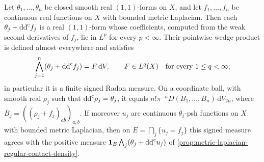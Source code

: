 \begin{corollary}\label{cor:metric-laplacian-barrier-determinants}
Let $\theta_1,\ldots,\theta_n$ be closed smooth real $(1,1)$-forms on $X$, and let $f_1,\ldots,f_n$ be continuous real functions on $X$ with bounded metric Laplacian. Then each $\theta_j+\mathrm{dd}^{\mathrm{c}} f_j$ is a real $(1,1)$-form whose coefficients, computed from the weak second derivatives of $f_j$, lie in $L^p$ for every $p<\infty$. Their pointwise wedge product is defined almost everywhere and satisfies
\[
 \bigwedge_{j=1}^n(\theta_j+\mathrm{dd}^{\mathrm{c}} f_j)
       =F\,\mathrm dV,\qquad F\in L^q(X)\quad\text{for every }1\leq q<\infty;
\]
in particular it is a finite signed Radon measure. On a coordinate ball, with smooth real $\rho_j$ such that $\mathrm{dd}^{\mathrm{c}}\rho_j=\theta_j$, it equals $n!\pi^{-n}D(B_1,\ldots,B_n)\,\mathrm dV_{2n}$, where $B_j=((\rho_j+f_j)_{a\bar b})_{a,b}$. If moreover $u_j$ are continuous $\theta_j$-psh functions on $X$ with bounded metric Laplacian, then on $E=\bigcap_j\{u_j=f_j\}$ this signed measure agrees with the positive measure $\mathbf1_E\bigwedge_j(\theta_j+\mathrm{dd}^{\mathrm{c}} u_j)$ of \cref{prop:metric-laplacian-regular-contact-density}.
\end{corollary}
